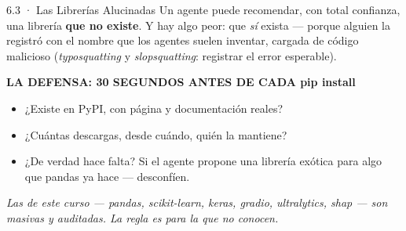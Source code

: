 \documentclass[aspectratio=169, 11pt]{beamer}
\begin{document}
\begin{frame}[shrink=5]{6.3 · Las Librerías Alucinadas}
  \vspace{2pt}
  {\scriptsize\color{textMuted}
   Un agente puede recomendar, con total confianza, una librería \textbf{que
   no existe}. Y hay algo peor: que \emph{sí} exista --- porque alguien la
   registró con el nombre que los agentes suelen inventar, cargada de código
   malicioso (\emph{typosquatting} y \emph{slopsquatting}: registrar el
   error esperable).}
  \vspace{2pt}
  \begin{tcolorbox}[colback=arcaGray, colframe=arcaDark, boxrule=0pt,
    leftrule=4pt, arc=3pt, left=10pt, right=10pt, top=4pt, bottom=4pt]
    {\scriptsize\color{arcaDark}\bfseries LA DEFENSA: 30 SEGUNDOS ANTES DE CADA pip install}\\[2pt]
    {\scriptsize\color{textMuted}
    \begin{itemize}\setlength{\itemsep}{2pt}
      \item ¿Existe en PyPI, con página y documentación reales?
      \item ¿Cuántas descargas, desde cuándo, quién la mantiene?
      \item ¿De verdad hace falta? Si el agente propone una librería exótica
            para algo que pandas ya hace --- desconfíen.
    \end{itemize}}
  \end{tcolorbox}
  \vspace{2pt}
  {\scriptsize\color{arcaDark}\itshape
   Las de este curso --- pandas, scikit-learn, keras, gradio, ultralytics,
   shap --- son masivas y auditadas. La regla es para la que no conocen.}
\end{frame}
\end{document}
